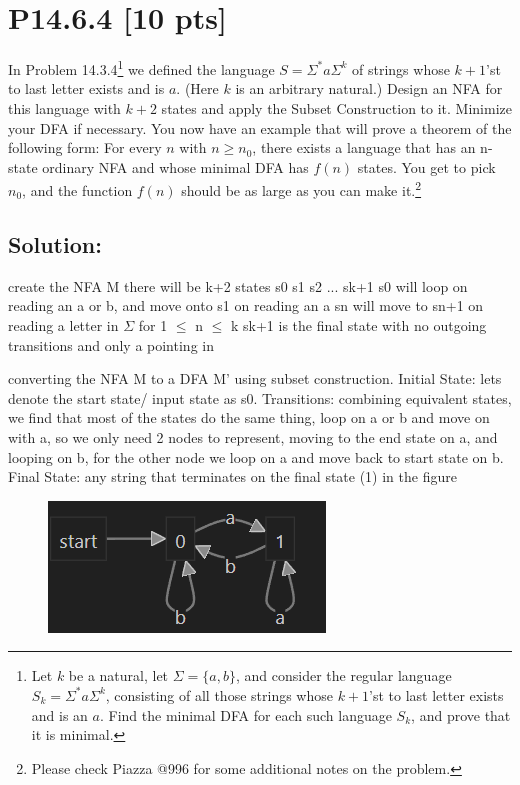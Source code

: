 \documentclass[12pt]{article}
\begin{document}
\newpage
\section*{\textbf{P14.6.4} [10 pts]}
In Problem 14.3.4\footnote{Let $k$ be a natural, let $\Sigma = \{a, b\}$, and consider the regular language $S_k = \Sigma^*a\Sigma^k$, consisting of all those strings whose $k + 1$’st to last letter exists and is an $a$. Find the minimal DFA for each such language $S_k$, and prove that it is minimal.} we defined the language $S = \Sigma^*a\Sigma^k$ of strings whose $k + 1$’st to last letter exists and is $a$. (Here $k$ is an arbitrary natural.) Design an NFA for this language with $k+2$ states and apply the Subset Construction to it. Minimize your DFA if necessary. You now have an example that will prove a theorem of the following form: For every $n$ with $n \geq n_0$, there exists a language that has an n-state ordinary NFA and whose minimal DFA has $f(n)$ states. You get to pick $n_0$, and the function $f(n)$ should be as large as you can make it.\footnote{Please check Piazza @996 for some additional notes on the problem.}


\subsection*{\textbf{Solution:}}

create the NFA M\newline
there will be k+2 states s0 s1 s2 ... sk+1\newline
s0 will loop on reading an a or b, and move onto s1 on reading an a\newline
sn will move to sn+1 on reading a letter in $\Sigma$ for 1 $\le$ n $\le$ k\newline
sk+1 is the final state with no outgoing transitions and only a pointing in\newline

converting the NFA M to a DFA M' using subset construction. Initial State: lets denote the start state/ input state as s0. Transitions: combining equivalent states, we find that most of the states do the same thing, loop on a or b and move on with a, so we only need 2 nodes to represent, moving to the end state on a, and looping on b, for the other node we loop on a and move back to start state on b. Final State: any string that terminates on the final state (1) in the figure
\begin{figure}[h]
    \centering
    \includegraphics[width=.5\linewidth]{Screenshot 2024-05-10 201301.png}
\end{figure}
\end{document}

